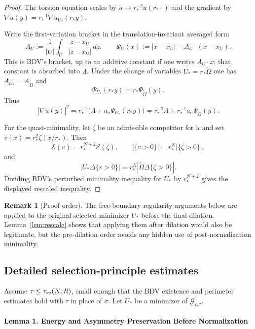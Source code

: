\documentclass[11pt]{amsart}
\theoremstyle{definition}
\newtheorem{remark}[theorem]{Remark}
\newcommand{\abs}[1]{\left|#1\right|}
\renewcommand{\d}{\,d}
\begin{document}
\begin{proof}
The torsion equation scales by $u\mapsto r_*^{-2}u(r_*\cdot)$ and the gradient
by $\nabla\widetilde u(y)=r_*^{-1}\nabla u_{U_*}(r_*y)$.

Write the first-variation bracket in the translation-invariant averaged form
\[
A_U:=\frac1{\abs U}\int_U\frac{z-x_U}{\abs{z-x_U}}\d z,\qquad
\Psi_U(x):=\abs{x-x_U}-A_U\cdot(x-x_U).
\]
This is BDV's bracket, up to an additive constant if one writes $A_U\cdot x$;
that constant is absorbed into $\Lambda$. Under the change of variables
$U_*=r_*\widetilde\Omega$ one has $A_{U_*}=A_{\widetilde\Omega}$ and
\[
\Psi_{U_*}(r_*y)=r_*\Psi_{\widetilde\Omega}(y).
\]
Thus
\[
\abs{\nabla\widetilde u(y)}^2
=r_*^{-2}\bigl(\Lambda+a_\sigma\Psi_{U_*}(r_*y)\bigr)
=r_*^{-2}\Lambda+r_*^{-1}a_\sigma\Psi_{\widetilde\Omega}(y).
\]

For the quasi-minimality, let $\zeta$ be an admissible competitor for
$\widetilde u$ and set $v(x)=r_*^2\zeta(x/r_*)$. Then
\[
\mathcal E(v)=r_*^{N+2}\mathcal E(\zeta),\qquad
\abs{\{v>0\}}=r_*^N\abs{\{\zeta>0\}},
\]
and
\[
\abs{U_*\Delta\{v>0\}}=r_*^N
\abs{\widetilde\Omega\Delta\{\zeta>0\}}.
\]
Dividing BDV's perturbed minimality inequality for $U_*$ by $r_*^{N+2}$
gives the displayed rescaled inequality.
\end{proof}

\begin{remark}[Proof order]
The free-boundary regularity arguments below are applied to the original
selected minimizer $U_*$ before the final dilation. Lemma~\ref{lem:rescale}
shows that applying them after dilation would also be legitimate, but the
pre-dilation order avoids any hidden use of post-normalization minimality.
\end{remark}

\subsection{Detailed selection-principle estimates}\label{ss:selection-details}

Assume \(\tau\le\tau_{\rm ex}(N,R)\), small enough that the BDV existence and
perimeter estimates hold with \(\tau\) in place of \(\sigma\). Let
\(U_*\) be a minimizer of \(\mathcal G_{\varepsilon,\tau}\).

\paragraph{Lemma 1. Energy and Asymmetry Preservation Before Normalization}
\end{document}
